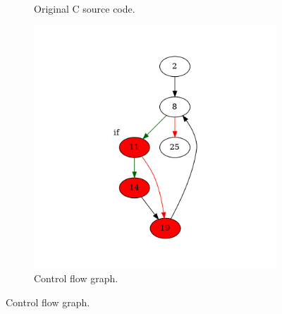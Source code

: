 \begin{figure}[htbp]
	\centering
	\begin{subfigure}[b]{0.48\textwidth}
		\centering
		
		\caption{Original C source code.}
	\end{subfigure}
	\begin{subfigure}[b]{0.50\textwidth}
		\centering
		\includegraphics[width=\textwidth]{inc/appendices/examples/hammock/example/without-break/main_0002a.png}
		\caption{Control flow graph.}
	\end{subfigure}
\end{figure}

